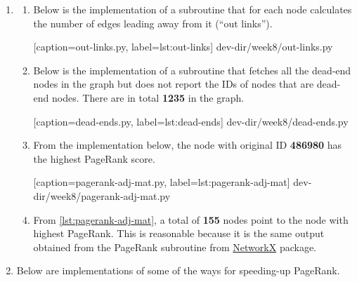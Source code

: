 \documentclass{article}
\begin{document}
\begin{enumerate}[leftmargin={*}, font={\bf}, label={\arabic*.}, ref={\arabic*}]
  \item \label{qst:1}
    \begin{enumerate}[label={(\Alph*)}, ref={\theenumi(\Alph*)}]
      \item
        Below is the implementation of a subroutine that for each node calculates
        the number of edges leading away from it (``out links'').
        
          [caption={\sf out-links.py}, label={lst:out-links}]
          {dev-dir/week8/out-links.py}

      \item
        Below is the implementation of a subroutine that fetches all the dead-end
        nodes in the graph but does not report the IDs of nodes that are dead-end
        nodes. There are in total {\bf 1235} in the graph.
        
          [caption={\sf dead-ends.py}, label={lst:dead-ends}]
          {dev-dir/week8/dead-ends.py}
          
      \newpage

      \item
        From the implementation below, the node with original ID {\bf 486980} has
        the highest {\sf PageRank} score.
        
          [caption={\sf pagerank-adj-mat.py}, label={lst:pagerank-adj-mat}]
          {dev-dir/week8/pagerank-adj-mat.py}

      \item
        From \autoref{lst:pagerank-adj-mat}, a total of {\bf 155} nodes point to the
        node with highest {\sf PageRank}. This is reasonable because it is the same
        output obtained from the {\sf PageRank} subroutine from
        \href{https://networkx.org/}{\url{NetworkX}} package.
    \end{enumerate}
    
  \newpage

  \item \label{qst:2}
    Below are implementations of some of the ways for speeding-up {\sf PageRank}.


\end{enumerate}
\end{document}
